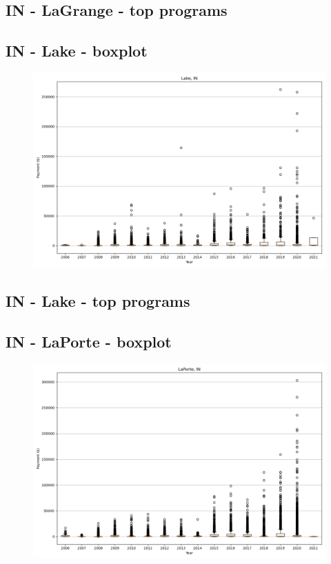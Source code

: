 \subsection*{IN - LaGrange - top programs}

\newpage
\subsection*{IN - Lake - boxplot}
\begin{figure}[h]
\centering
\includegraphics[width=7in]{../output/boxplots/counties/Lake-IN_boxplot.png}
\end{figure}


\subsection*{IN - Lake - top programs}

\newpage
\subsection*{IN - LaPorte - boxplot}
\begin{figure}[h]
\centering
\includegraphics[width=7in]{../output/boxplots/counties/LaPorte-IN_boxplot.png}
\end{figure}


